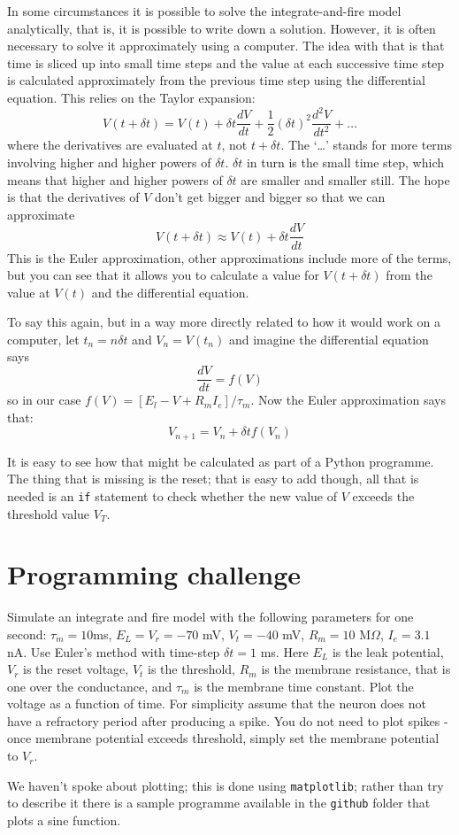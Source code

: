 \documentclass[12pt]{article}
\begin{document}
In some circumstances it is possible to solve the integrate-and-fire
model analytically, that is, it is possible to write down a
solution. However, it is often necessary to solve it approximately
using a computer. The idea with that is that time is sliced up into
small time steps and the value at each successive time step is
calculated approximately from the previous time step using the
differential equation. This relies on the Taylor expansion:
\begin{equation}
V(t+\delta t)=V(t)+\delta t \frac{dV}{dt}+\frac{1}{2}(\delta t)^2\frac{d^2V}{dt^2}+\ldots
\end{equation}
where the derivatives are evaluated at $t$, not $t+\delta t$. The
\lq{}\ldots\rq{} stands for more terms involving higher and higher
powers of $\delta t$. $\delta t$ in turn is the small time step, which
means that higher and higher powers of $\delta t$ are smaller and
smaller still. The hope is that the derivatives of $V$ don't get bigger and bigger so that we can approximate
\begin{equation}
V(t+\delta t)\approx V(t)+\delta t \frac{dV}{dt}
\end{equation}
This is the Euler approximation, other approximations include more of
the terms, but you can see that it allows you to calculate a value for
$V(t+\delta t)$ from the value at $V(t)$ and the differential equation.

To say this again, but in a way more directly related to how it would
work on a computer, let $t_n=n\delta t$ and $V_n=V(t_n)$ and imagine the differential equation says
\begin{equation}
\frac{dV}{dt}=f(V)
\end{equation}
so in our case $f(V)=[E_l-V+R_mI_e]/\tau_m$. Now the
Euler approximation says that:
\begin{equation}
V_{n+1}=V_n+\delta t f(V_n)
\end{equation}

It is easy to see how that might be calculated as part of a Python
programme. The thing that is missing is the reset; that is easy to add
though, all that is needed is an \texttt{if} statement to check
whether the new value of $V$ exceeds the threshold value $V_T$.

\section*{Programming challenge}

Simulate an integrate and fire model with the following parameters for
one second: $\tau_m = 10 $ms, $E_L = V_r = -70$ mV, $V_t = -40$ mV,
$R_m= 10$ M$\Omega$, $I_e = 3.1 $ nA. Use Euler's method with time-step
$\delta t = 1$ ms. Here $E_L$ is the leak potential, $V_r$ is the
reset voltage, $V_t$ is the threshold, $R_m$ is the membrane
resistance, that is one over the conductance, and $\tau_m$ is the
membrane time constant. Plot the voltage as a function of time. For
simplicity assume that the neuron does not have a refractory period
after producing a spike. You do not need to plot spikes - once
membrane potential exceeds threshold, simply set the membrane
potential to $V_r$.

We haven't spoke about plotting; this is done using
\texttt{matplotlib}; rather than try to describe it there is a sample
programme available in the \texttt{github} folder that plots a sine
function.
\end{document}
